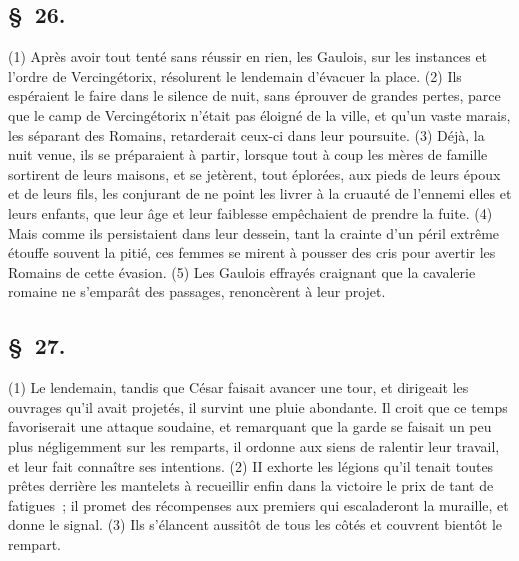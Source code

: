 \documentclass[french,twoside]{book} %
\begin{document}
\subsection[{§ 26.}]{ \textsc{§ 26.} }
\noindent (1) Après avoir tout tenté sans réussir en rien, les Gaulois, sur les instances et l’ordre de Vercingétorix, résolurent le lendemain d’évacuer la place. (2) Ils espéraient le faire dans le silence de nuit, sans éprouver de grandes pertes, parce que le camp de Vercingétorix n’était pas éloigné de la ville, et qu’un vaste marais, les séparant des Romains, retarderait ceux-ci dans leur poursuite. (3) Déjà, la nuit venue, ils se préparaient à partir, lorsque tout à coup les mères de famille sortirent de leurs maisons, et se jetèrent, tout éplorées, aux pieds de leurs époux et de leurs fils, les conjurant de ne point les livrer à la cruauté de l’ennemi elles et leurs enfants, que leur âge et leur faiblesse empêchaient de prendre la fuite. (4) Mais comme ils persistaient dans leur dessein, tant la crainte d’un péril extrême étouffe souvent la pitié, ces femmes se mirent à pousser des cris pour avertir les Romains de cette évasion. (5) Les Gaulois effrayés craignant que la cavalerie romaine ne s’emparât des passages, renoncèrent à leur projet.
\subsection[{§ 27.}]{ \textsc{§ 27.} }
\noindent (1) Le lendemain, tandis que César faisait avancer une tour, et dirigeait les ouvrages qu’il avait projetés, il survint une pluie abondante. Il croit que ce temps favoriserait une attaque soudaine, et remarquant que la garde se faisait un peu plus négligemment sur les remparts, il ordonne aux siens de ralentir leur travail, et leur fait connaître ses intentions. (2) II exhorte les légions qu’il tenait toutes prêtes derrière les mantelets à recueillir enfin dans la victoire le prix de tant de fatigues ; il promet des récompenses aux premiers qui escaladeront la muraille, et donne le signal. (3) Ils s’élancent aussitôt de tous les côtés et couvrent bientôt le rempart.
\end{document}
